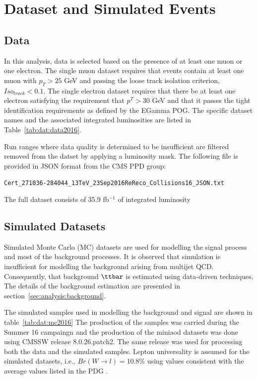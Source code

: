 \section{Dataset and Simulated Events}
\label{sec:analysis:dataset}


\subsection{Data}

In this analysis, data is selected based on the presence of at least one muon or one electron. The single muon dataset requires that events contain at least one muon with $p_T > 25$ GeV and passing the loose track isolation criterion, $Iso_{track} < 0.1$. The single electron dataset requires that there be at least one electron satisfying the requirement that $p^T > 30$ GeV and that it passes the tight identification requirements as defined by the EGamma POG.  The specific dataset names and the associated integrated luminosities are listed in Table~\ref{tab:dat:data2016}.



Run ranges where data quality is determined to be insufficient are filtered removed from the datset by applying a luminosity mask. The following file is provided in JSON format from the CMS PPD group:

\texttt{Cert\_271036-284044\_13TeV\_23Sep2016ReReco\_Collisions16\_JSON.txt}

The full dataset consists of 35.9 fb$^{-1}$ of integrated luminosity~\cite{cms:lumi2016:CMS-PAS-LUM-17-001}




\subsection{Simulated Datasets}
Simulated Monte Carlo (MC) datasets are used for modelling the signal process and most of the background processes. It is observed that simulation is insufficient for modelling the background arising from multijet QCD. Consequently, that background $\ttbar$ is estimated using data-driven techniques. The details of the background estimation are presented in section~\ref{sec:analysis:background}.

The simulated samples used in modelling the background and signal are shown in table~\ref{tab:dat:mc2016}  The production of the samples was carried during the Summer 16 campaingn and the production of the \acrfull{miniaod} datasets was done using CMSSW release 8.0.26.patch2. The same release was used for processing both the data and the simulated samples. Lepton universality is assumed for the simulated datasets, i.e., $ Br(W\to l) = 10.8\%$ using values consistent with the average values listed in the PDG \cite{exhep:pdg:Patrignani:2016xqp}. 

